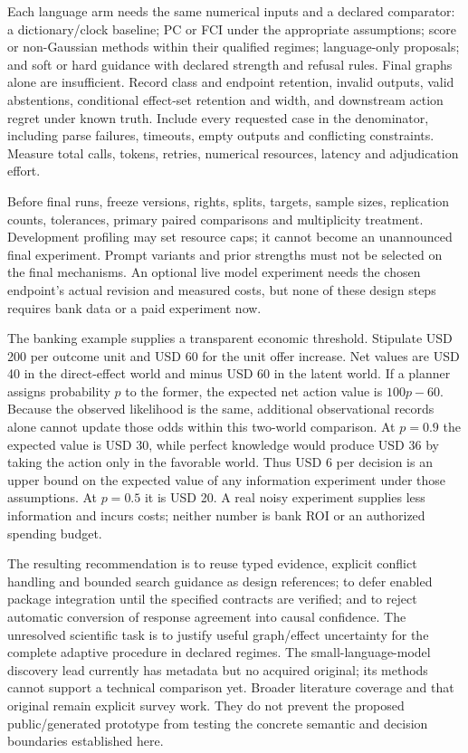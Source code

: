 Each language arm needs the same numerical inputs and a declared
comparator: a dictionary/clock baseline; PC or FCI under the appropriate
assumptions; score or non-Gaussian methods within their qualified
regimes; language-only proposals; and soft or hard guidance with
declared strength and refusal rules. Final graphs alone are
insufficient. Record class and endpoint retention, invalid outputs,
valid abstentions, conditional effect-set retention and width, and
downstream action regret under known truth. Include every requested case
in the denominator, including parse failures, timeouts, empty outputs
and conflicting constraints. Measure total calls, tokens, retries,
numerical resources, latency and adjudication effort.

Before final runs, freeze versions, rights, splits, targets, sample
sizes, replication counts, tolerances, primary paired comparisons and
multiplicity treatment. Development profiling may set resource caps; it
cannot become an unannounced final experiment. Prompt variants and prior
strengths must not be selected on the final mechanisms. An optional live
model experiment needs the chosen endpoint's actual revision and
measured costs, but none of these design steps requires bank data or a
paid experiment now.

The banking example supplies a transparent economic threshold. Stipulate
USD 200 per outcome unit and USD 60 for the unit offer increase. Net
values are USD 40 in the direct-effect world and minus USD 60 in the
latent world. If a planner assigns probability \(p\) to the former, the
expected net action value is \(100p-60\). Because the observed
likelihood is the same, additional observational records alone cannot
update those odds within this two-world comparison. At \(p=0.9\) the
expected value is USD 30, while perfect knowledge would produce USD 36
by taking the action only in the favorable world. Thus USD 6 per
decision is an upper bound on the expected value of any information
experiment under those assumptions. At \(p=0.5\) it is USD 20. A real
noisy experiment supplies less information and incurs costs; neither
number is bank ROI or an authorized spending budget.
\citep{exec14_iid_oracle}

The resulting recommendation is to reuse typed evidence, explicit
conflict handling and bounded search guidance as design references; to
defer enabled package integration until the specified contracts are
verified; and to reject automatic conversion of response agreement into
causal confidence. The unresolved scientific task is to justify useful
graph/effect uncertainty for the complete adaptive procedure in declared
regimes. The small-language-model discovery lead currently has metadata
but no acquired original; its methods cannot support a technical
comparison yet. Broader literature coverage and that original remain
explicit survey work. They do not prevent the proposed public/generated
prototype from testing the concrete semantic and decision boundaries
established here.

\label{exec14:iid-discovery-end}
